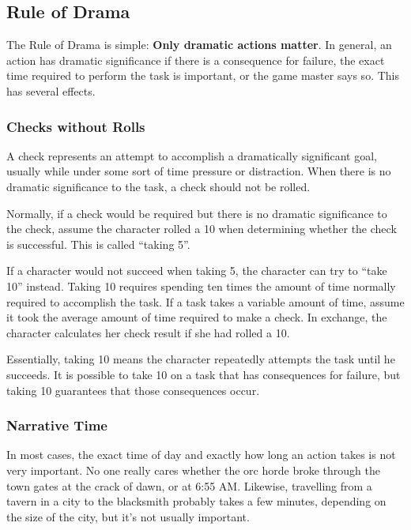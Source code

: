     \subsection{Rule of Drama}

        The Rule of Drama is simple: \textbf{Only dramatic actions matter}.
        In general, an action has dramatic significance if there is a consequence for failure, the exact time required to perform the task is important, or the game master says so.
        This has several effects.

        \subsubsection{Checks without Rolls}
            A check represents an attempt to accomplish a dramatically significant goal, usually while under some sort of time pressure or distraction.
            When there is no dramatic significance to the task, a check should not be rolled.

            \label{Taking 5}
            Normally, if a check would be required but there is no dramatic significance to the check, assume the character rolled a 10 when determining whether the check is successful.
            This is called ``taking 5''.

            \label{Taking 10}
            If a character would not succeed when taking 5, the character can try to ``take 10'' instead.
            Taking 10 requires spending ten times the amount of time normally required to accomplish the task.
            If a task takes a variable amount of time, assume it took the average amount of time required to make a check.
            In exchange, the character calculates her check result if she had rolled a 10.

            Essentially, taking 10 means the character repeatedly attempts the task until he succeeds.
            It is possible to take 10 on a task that has consequences for failure, but taking 10 guarantees that those consequences occur.

        \subsubsection{Narrative Time}
            In most cases, the exact time of day and exactly how long an action takes is not very important.
            No one really cares whether the orc horde broke through the town gates at the crack of dawn, or at 6:55 AM\@.
            Likewise, travelling from a tavern in a city to the blacksmith probably takes a few minutes, depending on the size of the city, but it's not usually important.

